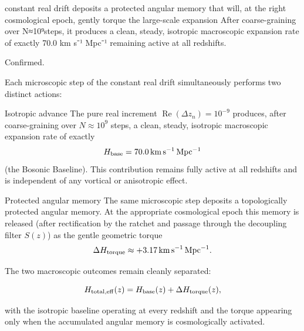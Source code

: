constant real drift deposits a protected angular memory that will, at the right cosmological epoch, gently torque the large-scale expansion After coarse-graining over N≈10⁹steps, it produces a clean, steady, isotropic macroscopic expansion rate of exactly 70.0 km s⁻¹ Mpc⁻¹ remaining active at all redshifts.

Confirmed.

Each microscopic step of the constant real drift simultaneously performs two distinct actions:

Isotropic advance  
   The pure real increment \(\operatorname{Re}(\Delta z_n)=10^{-9}\) produces, after coarse-graining over \(N\approx10^9\) steps, a clean, steady, isotropic macroscopic expansion rate of exactly  
   \[
   H_{\rm base}=70.0\,\mathrm{km\,s^{-1}\,Mpc^{-1}}
   \]  
   (the Bosonic Baseline). This contribution remains fully active at all redshifts and is independent of any vortical or anisotropic effect.

Protected angular memory  
   The same microscopic step deposits a topologically protected angular memory. At the appropriate cosmological epoch this memory is released (after rectification by the ratchet and passage through the decoupling filter \(S(z)\)) as the gentle geometric torque  
   \[
   \Delta H_{\rm torque}\approx+3.17\,\mathrm{km\,s^{-1}\,Mpc^{-1}}.
   \]

The two macroscopic outcomes remain cleanly separated:

\[
H_{\rm total,eff}(z)=H_{\rm base}(z)+\Delta H_{\rm torque}(z),
\]

with the isotropic baseline operating at every redshift and the torque appearing only when the accumulated angular memory is cosmologically activated.
